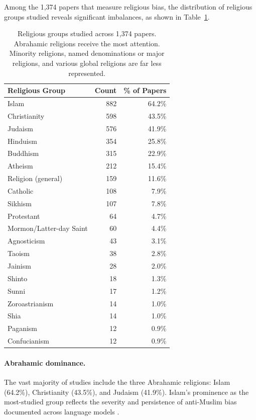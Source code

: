 \documentclass[]{fairmeta}
\begin{document}
Among the 1,374 papers that measure religious bias, the distribution of religious groups studied reveals significant imbalances, as shown in Table~\ref{tab:religious_groups}.

\begin{table}[htbp]
\centering
\caption{Religious groups studied across 1,374 papers. Abrahamic religions receive the most attention. Minority religions, named denominations or major religions, and various global religions are far less represented.}
\label{tab:religious_groups}
\begin{tabular}{lrr}
\toprule
\textbf{Religious Group} & \textbf{Count} & \textbf{\% of Papers} \\
\midrule
Islam & 882 & 64.2\% \\
Christianity & 598 & 43.5\% \\
Judaism & 576 & 41.9\% \\
Hinduism & 354 & 25.8\% \\
Buddhism & 315 & 22.9\% \\
Atheism & 212 & 15.4\% \\
Religion (general) & 159 & 11.6\% \\
Catholic & 108 & 7.9\% \\
Sikhism & 107 & 7.8\% \\
Protestant & 64 & 4.7\% \\
Mormon/Latter-day Saint & 60 & 4.4\% \\
Agnosticism & 43 & 3.1\% \\
Taoism & 38 & 2.8\% \\
Jainism & 28 & 2.0\% \\
Shinto & 18 & 1.3\% \\
Sunni & 17 & 1.2\% \\
Zoroastrianism & 14 & 1.0\% \\
Shia & 14 & 1.0\% \\
Paganism & 12 & 0.9\% \\
Confucianism & 12 & 0.9\% \\
\bottomrule
\end{tabular}
\end{table}

\paragraph{Abrahamic dominance.} The vast majority of studies include the three Abrahamic religions: Islam (64.2\%), Christianity (43.5\%), and Judaism (41.9\%). Islam's prominence as the most-studied group reflects the severity and persistence of anti-Muslim bias documented across language models \citep{abid2021, naous2024}.
\end{document}
